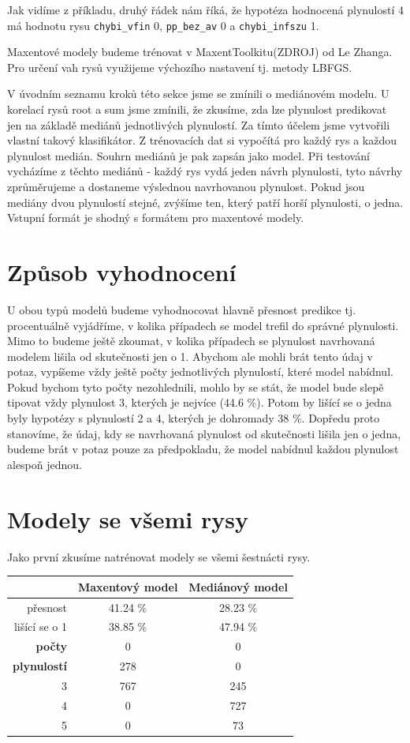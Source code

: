 \documentclass[12pt,a4paper]{report}
\begin{document}
Jak vidíme z příkladu, druhý řádek nám říká, že hypotéza hodnocená plynulostí 4 má hodnotu rysu \texttt{chybi\_vfin} 0, \texttt{pp\_bez\_av} 0 a \texttt{chybi\_infszu} 1.

Maxentové modely budeme trénovat v MaxentToolkitu(ZDROJ) od Le Zhanga. Pro určení vah rysů využijeme výchozího nastavení tj. metody LBFGS.

V úvodním seznamu kroků této sekce jsme se zmínili o mediánovém modelu. U korelací rysů root a sum jsme zmínili, že zkusíme, zda lze plynulost predikovat jen na základě mediánů jednotlivých plynulostí. Za tímto účelem jsme vytvořili vlastní takový klasifikátor. Z trénovacích dat si vypočítá pro každý rys a každou plynulost medián. Souhrn mediánů je pak zapsán jako model. Při testování vycházíme z těchto mediánů - každý rys vydá jeden návrh plynulosti, tyto návrhy zprůměrujeme a dostaneme výslednou navrhovanou plynulost. Pokud jsou mediány dvou plynulostí stejné, zvýšíme ten, který patří horší plynulosti, o jedna. Vstupní formát je shodný s formátem pro maxentové modely.

\section{Způsob vyhodnocení}
U obou typů modelů budeme vyhodnocovat hlavně přesnost predikce tj. procentuálně vyjádříme, v kolika případech se model trefil do správné plynulosti. Mimo to budeme ještě zkoumat, v kolika případech se plynulost navrhovaná modelem lišila od skutečnosti jen o 1. Abychom ale mohli brát tento údaj v potaz, vypíšeme vždy ještě počty jednotlivých plynulostí, které model nabídnul. Pokud bychom tyto počty nezohlednili, mohlo by se stát, že model bude slepě tipovat vždy plynulost 3, kterých je nejvíce (44.6 \%). Potom by lišící se o jedna byly hypotézy s plynulostí 2 a 4, kterých je dohromady 38 \%. Dopředu proto stanovíme, že údaj, kdy se navrhovaná plynulost od skutečnosti lišila jen o jedna, budeme brát v potaz pouze za předpokladu, že model nabídnul každou plynulost alespoň jednou. 


\section{Modely se všemi rysy}
Jako první zkusíme natrénovat modely se všemi šestnácti rysy.
\begin{center}
\begin{tabular}{|r|c|c|}
\hline
 & \textbf{Maxentový model} & \textbf{Mediánový model} \\
 \hline
přesnost & 41.24 \%  & 28.23 \%  \\
\hline
lišící se o 1 & 38.85 \% & 47.94 \%  \\
\hline
\textbf{počty} \quad 1 & \color{red}0 & \color{red}0 \\
\textbf{plynulostí} \quad 2 & 278 & \color{red}0 \\
 3 & 767 & 245 \\
 4 & \color{red}0 & 727 \\
 5 & \color{red}0 & 73 \\
\hline
\end{tabular}
\end{center}
\end{document}
